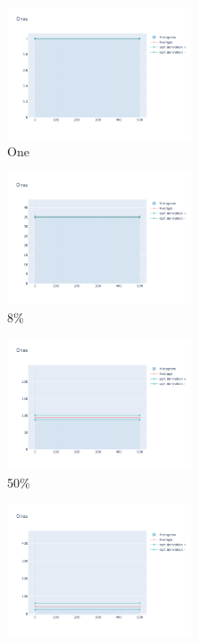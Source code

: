 \documentclass[12pt, fleqn]{report}                             %
\theoremstyle{break}                                            %
\begin{document}
      \begin{figure}[ht!]
        \centering
        \begin{subfigure}[b]{0.4\linewidth}
          \includegraphics[width=0.6\textwidth]{Images/24/dia-a.png}
          \caption{One}
        \end{subfigure}
        \begin{subfigure}[b]{0.4\linewidth}
          \includegraphics[width=0.6\textwidth]{Images/24/dia-b.png}
          \caption{8\%}
        \end{subfigure}
        \begin{subfigure}[b]{0.4\linewidth}
          \includegraphics[width=0.6\textwidth]{Images/24/dia-c.png}
          \caption{50\%}
        \end{subfigure}
        \begin{subfigure}[b]{0.4\linewidth}
          \includegraphics[width=0.6\textwidth]{Images/24/dia-d.png}

\end{subfigure}
\end{figure}
\end{document}
